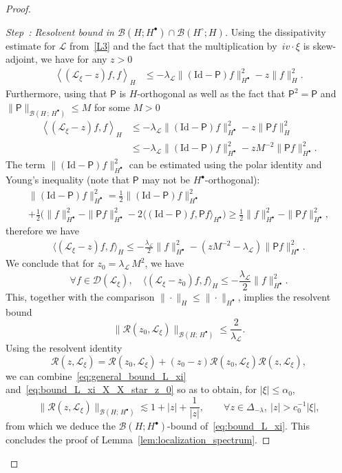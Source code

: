 \documentclass[AHL,Unicode,longabstracts,published]{cedram}
\newcommand{\Id}{\mathrm{Id}}
\newcommand{\LL}{\mathcal{L}}
\newcommand{\PP}{\mathsf{P}}
\newcommand{\RR}{\mathcal{R}}
\newcommand{\dom}{\mathscr{D}}
\newcommand{\BBB}{\mathscr{B}}
\newcommand{\Ss}{H}
\newcommand{\Ssp}{H^{\bullet}}
\newcommand{\Ssm}{H^{\circ}}
\renewcommand*\le{\leqslant}
\renewcommand*\ge{\geqslant}
\renewcommand*\leq{\leqslant}
\newcommand{\la}{\langle}
\newcommand{\ra}{\rangle}
\newcommand{\lla}{\left\langle}
\newcommand{\rra}{\right\rangle}
\newcounter{stepcount}
\newenvironment{step}[1]{\refstepcounter{stepcount}\begin{proof}[Step~\thestepcount: #1]}{\let\qed\relax\end{proof}}
\let\oldforall\forall
\renewcommand*{\forall}{\mathrel{\oldforall}}
\begin{document}
\begin{proof}
\begin{step}{{Resolvent bound in $\BBB(\Ss; \Ssp) \cap \BBB(\Ssm ; \Ss)$}}
Using the dissipativity estimate for $\LL$ from~\eqref{L3} and the fact that the multiplication by~$i v \cdot \xi$ is skew-adjoint, we have for any $z > 0$
\begin{align*}
\lla (\LL_\xi - z) f, f \rra_{\Ss} & \le - \lambda_\LL \| (\Id - \PP) f \|_{\Ssp}^2 - z \| f \|^2_{\Ss}.
\end{align*}
Furthermore, using that $\PP$ is $\Ss$-orthogonal as well as the fact that $\PP^2 = \PP$ and $\| \PP \|_{\BBB(\Ss\,;\,\Ssp)} \le M$ for some $M > 0$
\begin{align*}
\lla (\LL_\xi - z) f, f \rra_{\Ss} & \le - \lambda_\LL \| (\Id - \PP) f \|_{\Ssp}^2 - z \| \PP f \|^2_{\Ss} \\
& \le - \lambda_\LL \| (\Id - \PP) f \|_{\Ssp}^2 - z {M^{-2}} \| \PP f \|^2_{\Ssp}.
\end{align*}
The term $\| (\Id - \PP) f \|_{\Ssp}^2$ can be estimated using the polar identity and Young's inequality (note that $\PP$ may not be $\Ssp$-orthogonal):
\begin{multline}\label{eq:degenerate_pythagora_X_star}
\| (\Id - \PP) f \|_{\Ssp}^2  = \frac{1}{2} \| (\Id - \PP) f \|_{\Ssp}^2\\
+ \frac{1}{2} \Big(\| f \|^2_{\Ssp} - \| \PP f \|_{\Ssp}^2 - 2 \big\la (\Id - \PP) f, \PP f \big\ra_{\Ssp}\Big)
 \ge \frac{1}{2} \| f \|^2_{\Ssp} - \| \PP f \|_{\Ssp}^2,
\end{multline}
therefore we have
\begin{align*}
\big\la (\LL_\xi - z) f, f \big\ra_{\Ss} \le - \frac{\lambda_\LL}{2} \| f \|_{\Ssp}^2 - \left(z {M^{-2}} - \lambda_\LL \right) \| \PP f \|^2_{\Ssp}.
\end{align*}
We conclude that for $z_0 = {\lambda_\LL \,M^{2}}$, we have
\[
\forall f \in \dom(\LL_{\xi}), \quad \big\la (\LL_\xi - z_0) f, f \big\ra_{\Ss} \le - \frac{\lambda_\LL}{2} \| f \|_{\Ssp}^2.
\]
This, together with the comparison $\|\cdot\|_{\Ss} \leq \|\cdot\|_{\Ssp}$, implies the resolvent bound
\begin{equation}\label{eq:bound_L_xi_X_X_star_z_0}
\| \RR(z_{0},\LL_{\xi})\|_{\BBB(\Ss ;\,\Ssp)} \le \frac{2}{\lambda_\LL}.
\end{equation}
Using the resolvent identity
\begin{equation*}
\RR(z,\LL_{\xi}) = \RR(z_{0},\LL_{\xi})+ (z_0 - z) \RR(z_{0},\LL_{\xi})\RR(z,\LL_{\xi}),
\end{equation*}
we can combine~\eqref{eq:general_bound_L_xi} and~\eqref{eq:bound_L_xi_X_X_star_z_0} so as to obtain, for $|\xi| \le \alpha_{0}$,
\begin{equation}
\| \RR(z,\LL_{\xi}) \|_{\BBB(\Ss;\,\Ssp)}
\lesssim 1 + |z| + \frac{1}{|z|}, \qquad \forall z \in \Delta_{-\lambda},~|z| > c_0^{-1}|\xi|,
\end{equation}
from which we deduce the $\BBB(\Ss;\Ssp)$-bound of~\eqref{eq:bound_L_xi}. This concludes the proof of Lemma~\ref{lem:localization_spectrum}.\qedhere
\end{step}\let\qed\relax
\end{proof}
\end{document}

